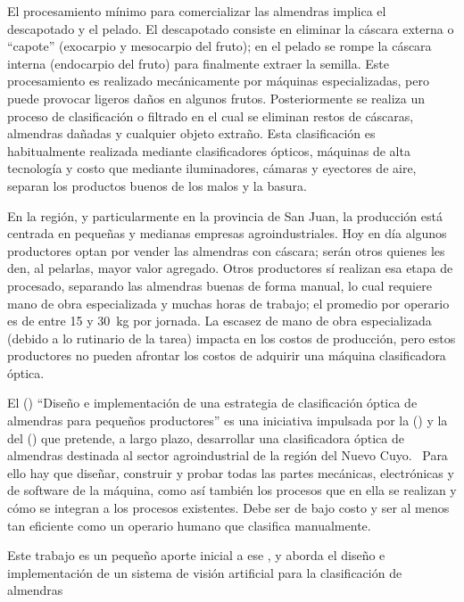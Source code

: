 El procesamiento mínimo para comercializar las almendras implica el descapotado y el pelado. El descapotado consiste en eliminar la cáscara externa o \enquote{capote} (exocarpio y mesocarpio del fruto); en el pelado se rompe la cáscara interna (endocarpio del fruto) para finalmente extraer la semilla. Este procesamiento es realizado mecánicamente por máquinas especializadas, pero puede provocar ligeros daños en algunos frutos. Posteriormente se realiza un proceso de clasificación o filtrado en el cual se eliminan restos de cáscaras, almendras dañadas y cualquier objeto extraño. Esta clasificación es habitualmente realizada mediante clasificadores ópticos, máquinas de alta tecnología y costo que mediante iluminadores, cámaras y eyectores de aire, separan los productos buenos de los malos y la basura.

En la región, y particularmente en la provincia de San Juan, la producción está centrada en pequeñas y medianas empresas agroindustriales. Hoy en día algunos productores optan por vender las almendras con cáscara; serán otros quienes les den, al pelarlas, mayor valor agregado. Otros productores sí realizan esa etapa de procesado, separando las almendras buenas de forma manual, lo cual requiere mano de obra especializada y muchas horas de trabajo; el promedio por operario es de entre \num{15} y \SI{30}{\kg} por jornada. La escasez de mano de obra especializada (debido a lo rutinario de la tarea) impacta en los costos de producción, pero estos productores no pueden afrontar los costos de adquirir una máquina clasificadora óptica.

El  () \enquote{Diseño e implementación de una estrategia de clasificación óptica de almendras para pequeños productores} es una iniciativa impulsada por la  () y la  del  () que pretende, a largo plazo, desarrollar una clasificadora óptica de almendras destinada al sector  agroindustrial de la región del Nuevo Cuyo.~\autocite{pdts} Para ello hay que diseñar, construir y probar todas las partes mecánicas, electrónicas y de software de la máquina, como así también los procesos que en ella se realizan y cómo se integran a los procesos existentes. Debe ser de bajo costo y ser al menos tan eficiente como un operario humano que clasifica manualmente.

Este trabajo es un pequeño aporte inicial a ese , y aborda el diseño e implementación de un sistema de visión artificial para la clasificación de almendras




